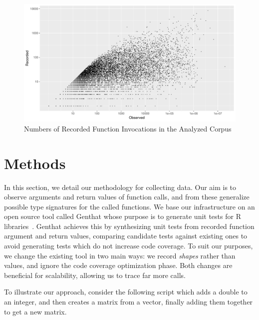 \documentclass[acmsmall,10pt,review,anonymous]{acmart}\settopmatter{printfolios=true,printccs=false,printacmref=false}
\newcommand{\genthat}{{\sc Genthat}\xspace}
\begin{document}
\begin{figure}[htbp]\begin{center}
\includegraphics[width=.9\textwidth]{recordsbypkg}
\caption{Numbers of Recorded Function Invocations in the Analyzed Corpus}
\label{recorded}\end{center}
\end{figure}

\newpage
\section{Methods}

In this section, we detail our methodology for collecting data.  Our aim is
to observe arguments and return values of function calls, and from these
generalize possible type signatures for the called functions.  We base our
infrastructure on an open source tool called \genthat whose purpose is to
generate unit tests for R libraries~\cite{issta18}.  \genthat achieves this
by synthesizing unit tests from recorded function argument and return
values, comparing candidate tests against existing ones to avoid generating tests
which do not increase code coverage.  To suit our purposes, we change the
existing tool in two main ways: we record \emph{shapes} rather than values,
and ignore the code coverage optimization phase.  Both changes are
beneficial for scalability, allowing us to trace far more calls.


To illustrate our approach, consider the following script which adds a
double to an integer, and then creates a matrix from a vector, finally
adding them together to get a new matrix.
\end{document}

